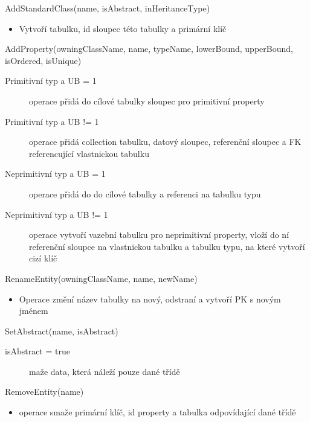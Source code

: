\documentclass[11pt,twoside,a4paper]{book}
\begin{document}
\begin{list}{Operace :}{}
  \item AddStandardClass(name, isAbstract, inHeritanceType)
  \begin{itemize}
    \item Vytvoří tabulku, id sloupec této tabulky a primární klíč
  \end{itemize}
  
  \item AddProperty(owningClassName, name, typeName, lowerBound, upperBound,
  isOrdered, isUnique)
  \begin{description}
    \item[Primitivní typ a UB = 1] operace přidá do cílové tabulky sloupec pro
    primitivní property
    \item[Primitivní typ a UB != 1] operace přidá collection tabulku, datový
    sloupec, referenční sloupec a FK referencující vlastnickou tabulku
    \item[Neprimitivní typ a UB = 1] operace přidá do do cílové tabulky a
    referenci na tabulku typu
    \item[Neprimitivní typ a UB != 1] operace vytvoří vazební tabulku pro
    neprimitivní property, vloží do ní referenční sloupce na vlastnickou
    tabulku a tabulku typu, na které vytvoří cizí klíč
  \end{description}
  
  \item RenameEntity(owningClassName, name, newName)
  \begin{itemize}
    \item Operace změní název tabulky na nový, odstraní a vytvoří PK s
novým jménem
  \end{itemize}
  
  \item SetAbstract(name, isAbstract)
  \begin{description}
    \item[isAbstract = true] maže data, která náleží pouze dané třídě
  \end{description}
  
  \item RemoveEntity(name)
  \begin{itemize}
    \item operace smaže primární klíč, id property a tabulka
odpovídající dané třídě
  \end{itemize}
  

\end{list}
\end{document}
